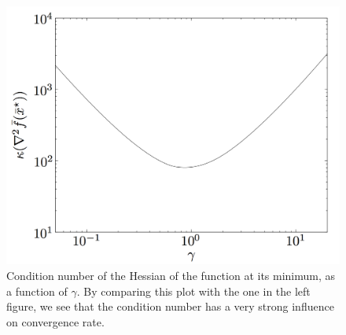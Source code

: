 \begin{frame}
\begin{columns}
  \begin{column}{0.5\textwidth}
    \begin{figure}[ht!]
      \centering
\includegraphics[scale=0.15]{pics/ga2.png}
\caption{\tiny Condition number of the Hessian of the function at its
  minimum, as a function of $\gamma$. By comparing this plot with the
  one in the left figure, we see that the condition number has a very strong influence on convergence rate.}
    \end{figure}
  \end{column}
\end{columns}
\end{frame}

